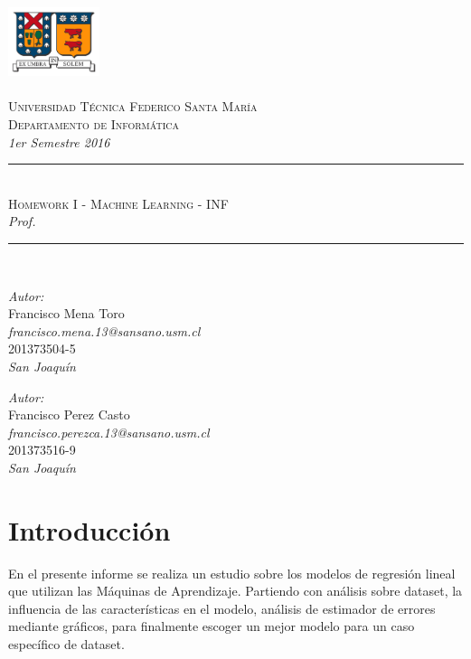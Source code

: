 \documentclass[10pt]{article}
\newcommand{\HRule}{\rule{\linewidth}{0.25mm}}
\begin{document}
\begin{center}
\includegraphics[width=0.2\textwidth]{images/logo_usm}~\\[1.2cm]
~\\[-1.5cm]

\textsc{\large Universidad T\'ecnica Federico Santa Mar\'ia}\\[0.2cm]
\textsc{\large Departamento de Inform\'atica}\\[0.2cm]
\textit{1er Semestre 2016}\\[4cm]

\HRule \\[0.6cm]
{\Large \textsc{Homework I - Machine Learning - INF}}\\[0.4cm]
{\Large \textit{Prof. }}\\[0.1cm]
\HRule \\[0.8cm]

\begin{minipage}{0.4\textwidth}
\begin{center}
\emph{Autor:}\\
Francisco Mena Toro\\ \textit{francisco.mena.13@sansano.usm.cl} \\ 201373504-5 \\
\emph{San Joaqu\'in}
\end{center}
\end{minipage}
\begin{minipage}{0.4\textwidth}
\begin{center}
\emph{Autor:}\\
Francisco Perez Casto\\ \textit{francisco.perezca.13@sansano.usm.cl} \\ 201373516-9 \\
\emph{San Joaqu\'in}
\end{center}
\end{minipage}
\end{center}

\vspace{2cm}

\newpage


\section*{Introducción}
En el presente informe se realiza un estudio sobre los modelos de regresión lineal que utilizan las Máquinas de Aprendizaje. Partiendo con análisis sobre dataset, la influencia de las características en el modelo, análisis de estimador de errores mediante gráficos, para finalmente escoger un mejor modelo para un caso específico de dataset. \\
\end{document}
